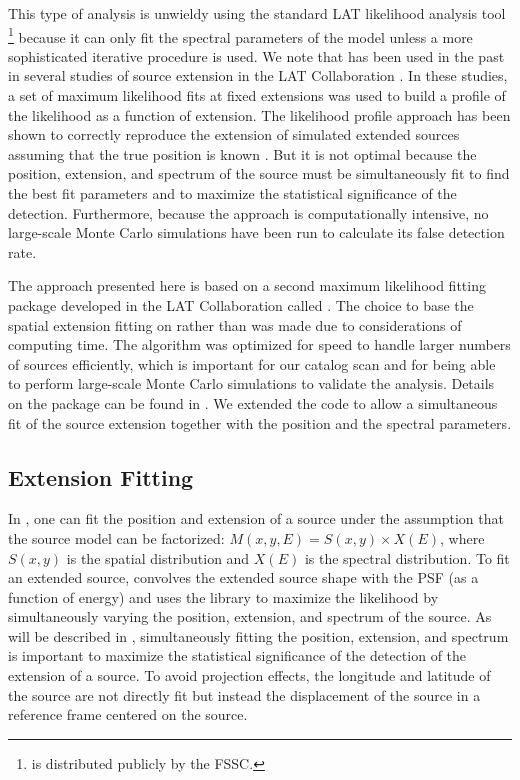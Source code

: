 This type of analysis is unwieldy using the standard
LAT likelihood analysis tool \gtlike\footnote{\gtlike is
distributed publicly by the FSSC.} because it can only fit the
spectral parameters of the model unless a more sophisticated
iterative procedure is used.  We note that \gtlike has been used in
the past in several studies of source extension in the LAT Collaboration
\citep{abdo_2010a_observations-large,abdo_2010a_detection-small,abdo_2010d_fermi-large,abdo_2009a_fermi-discovery}.
In these studies, a set of \gtlike maximum likelihood fits at fixed
extensions was used to build a profile of the likelihood as a function
of extension.  The \gtlike likelihood profile approach has been shown to
correctly reproduce the extension of simulated extended sources assuming
that the true position is known \citep{giordano_2011a_extension-studies}.
But it is not optimal because the position, extension, and spectrum of
the source must be simultaneously fit to find the best fit parameters and
to maximize the statistical significance of the detection.  Furthermore,
because the \gtlike approach is computationally intensive, no large-scale
Monte Carlo simulations have been run to calculate its false detection
rate.

The approach presented here is based on a second maximum likelihood
fitting package developed in the LAT Collaboration called \pointlike
\citep{abdo_2010b_fermi-large,kerr_2010a_likelihood-methods}.  The choice
to base the spatial extension fitting on \pointlike rather than \gtlike
was made due to considerations of computing time.  The \pointlike
algorithm was optimized for speed to handle larger numbers of sources
efficiently, which is important for our catalog scan and for being
able to perform large-scale Monte Carlo simulations to validate
the analysis.  Details on the \pointlike package can be found in
\cite{kerr_2010a_likelihood-methods}.  We extended the code to allow a
simultaneous fit of the source extension together with the position and
the spectral parameters.

\subsection{Extension Fitting}

In \pointlike, one can fit the position and extension of a source
under the assumption that the source model can be factorized:
$M(x,y,E)=S(x,y)\times X(E)$, where $S(x,y)$ is the spatial distribution
and $X(E)$ is the spectral distribution.  To fit an extended source,
\pointlike convolves the extended source shape with the PSF (as a function
of energy) and uses the \minuit library \citep{james_1975a_minuit-system}
to maximize the likelihood by simultaneously varying the position,
extension, and spectrum of the source.  As will be described in
, simultaneously fitting the position,
extension, and spectrum is important to maximize the statistical
significance of the detection of the extension of a source.  To avoid
projection effects, the longitude and latitude of the source are not
directly fit but instead the displacement of the source in a reference
frame centered on the source.

